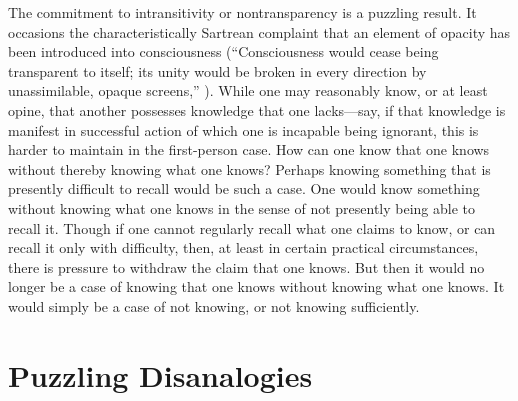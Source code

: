 The commitment to intransitivity or nontransparency is a puzzling result. It occasions the characteristically Sartrean complaint that an element of opacity has been introduced into consciousness (``Consciousness would cease being transparent to itself; its unity would be broken in every direction by unassimilable, opaque screens,'' \citealt[6]{Sartre:1948aa}). While one may reasonably know, or at least opine, that another possesses knowledge that one lacks—say, if that knowledge is manifest in successful action of which one is incapable being ignorant, this is harder to maintain in the first-person case. How can one know that one knows without thereby knowing what one knows? Perhaps knowing something that is presently difficult to recall would be such a case. One would know something without knowing what one knows in the sense of not presently being able to recall it. Though if one cannot regularly recall what one claims to know, or can recall it only with difficulty, then, at least in certain practical circumstances, there is pressure to withdraw the claim that one knows. But then it would no longer be a case of knowing that one knows without knowing what one knows. It would simply be a case of not knowing, or not knowing sufficiently.



\section{Puzzling Disanalogies} %
\label{sec:puzzling_disanalogies}

